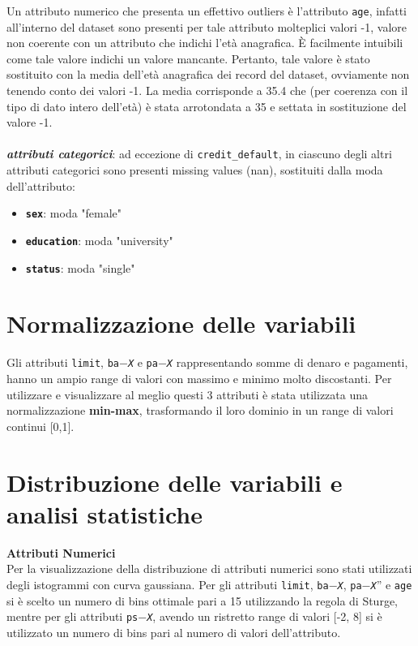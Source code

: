 Un attributo numerico che presenta un effettivo outliers è l’attributo \texttt{age}, infatti all’interno del dataset sono presenti per tale attributo molteplici valori -1, valore non coerente con un attributo che indichi l’età anagrafica. È facilmente intuibili come tale valore indichi un valore mancante. Pertanto, tale valore è stato sostituito con la media dell’età anagrafica dei record del dataset, ovviamente non tenendo conto dei valori -1. La media corrisponde a 35.4 che (per coerenza con il tipo di dato intero dell’età) è stata arrotondata a 35 e settata in sostituzione del valore -1.\\\\
\textit{\textbf{attributi categorici}}: ad eccezione di \texttt{credit\_default}, in ciascuno degli altri attributi categorici sono presenti missing values (nan), sostituiti dalla moda dell’attributo:
\begin{itemize}
\item \textbf{\texttt{sex}}: moda "female"
\item \textbf{\texttt{education}}: moda "university"
\item \textbf{\texttt{status}}: moda "single"
\end{itemize}

\section{Normalizzazione delle variabili}
Gli attributi \texttt{limit}, \texttt{ba$-$\textit{X}} e \texttt{pa$-$\textit{X}} rappresentando somme di denaro e pagamenti, hanno un ampio range di valori con massimo e minimo molto discostanti. Per utilizzare e visualizzare al meglio questi 3 attributi è stata utilizzata una normalizzazione \textbf{min-max}, trasformando il loro dominio in un range di valori continui [0,1].

\section{Distribuzione delle variabili e analisi statistiche}
\textbf{Attributi Numerici}\\
Per la visualizzazione della distribuzione di attributi numerici sono stati utilizzati degli istogrammi con curva gaussiana. Per gli attributi \texttt{limit},  \texttt{ba$-$\textit{X}}, \texttt{pa$-$\textit{X}}” e \texttt{age} si è scelto un numero di bins ottimale pari a 15 utilizzando la regola di Sturge, mentre per gli attributi  \texttt{ps$-$\textit{X}}, avendo un ristretto range di valori [-2, 8] si è utilizzato un numero di bins pari al numero di valori dell’attributo.

